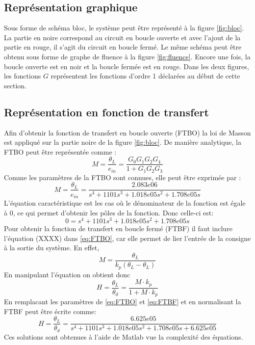 \documentclass{udes_rapport} %
\begin{document}
\subsection{Représentation graphique}
Sous forme de schéma bloc, le système peut être représenté à la figure \ref{fig:bloc}.
La partie en noire correspond au circuit en boucle ouverte et avec l'ajout de la partie en rouge, il s'agit du circuit en boucle fermé. Le même schéma peut être obtenu sous forme de graphe de fluence à la figure \ref{fig:fluence}.
Encore une fois, la boucle ouverte est en noir et la boucle fermée est en rouge. Dans les deux figures, les fonctions $G$ représentent les fonctions d'ordre 1 déclarées au début de cette section.
\subsection{Représentation en fonction de transfert}
Afin d'obtenir la fonction de transfert en boucle ouverte (FTBO) la loi de Masson est appliqué sur la partie noire de la figure \ref{fig:bloc}. De manière analytique, la FTBO peut être représentée comme :
\begin{equation}
M = \frac{\theta_L}{e_{in}} = \frac{G_0 G_1 G_2 G_4}{1 + G_1 G_2 G_3}
\label{eq:FTBO}
\end{equation}
Comme les paramètres de la FTBO sont connues, elle peut être exprimée par :
\begin{equation}
M = \frac{\theta_L}{e_{in}} = \frac{2.083e06}{s^4 + 1101s^3 + 1.018e05s^2 + 1.708e05s}
\label{eq:nmum_FTBO}
\end{equation}
L'équation caractéristique est les cas où le dénominateur de la fonction est égale à 0, ce qui permet d'obtenir les pôles de la fonction. Donc celle-ci est:
\begin{equation}
0 = s^4 + 1101s^3 + 1.018e05s^2 + 1.708e05s
\label{eq:caracteristic}
\end{equation}
Pour obtenir la fonction de transfert en boucle fermé (FTBF) il faut inclure l'équation (XXXX) dans \eqref{eq:FTBO}, car elle permet de lier l'entrée de la consigne à la sortie du système. En effet,
\[	M = \frac{\theta_L}{k_p (\theta_L -\theta_L )}	\]
En manipulant l'équation on obtient donc
\begin{equation}
H = \frac{\theta_L}{\theta_d} = \frac{M \cdot k_p}{1+M \cdot k_p}
\label{eq:FTBF}
\end{equation}
En remplacant les paramètres de \eqref{eq:FTBO} et \eqref{eq:FTBF} et en normalisant la FTBF peut être écrite comme:
\begin{equation}
H = \frac{\theta_L}{\theta_d} = \frac{6.625e05}{s^4 + 1101s^3 + 1.018e05s^2 + 1.708e05s + 6.625e05}
\label{eq:nmum_FTBF}
\end{equation}
Ces solutions sont obtenues à l'aide de Matlab vue la complexité des équations.
\end{document}
